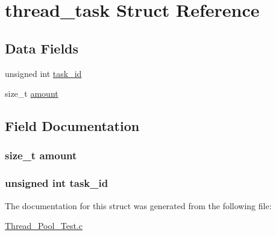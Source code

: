 \hypertarget{structthread__task}{}\section{thread\+\_\+task Struct Reference}
\label{structthread__task}
\subsection*{Data Fields}
\begin{DoxyCompactItemize}
\item 
unsigned int \hyperlink{structthread__task_a58c57e49f419d348fbd6a2fc249e008f}{task\+\_\+id}
\item 
size\+\_\+t \hyperlink{structthread__task_a09041dfaf996bee7cc220f076325f2ec}{amount}
\end{DoxyCompactItemize}


\subsection{Field Documentation}
\hypertarget{structthread__task_a09041dfaf996bee7cc220f076325f2ec}{}
\subsubsection[{amount}]{\setlength{\rightskip}{0pt plus 5cm}size\+\_\+t amount}\label{structthread__task_a09041dfaf996bee7cc220f076325f2ec}
\hypertarget{structthread__task_a58c57e49f419d348fbd6a2fc249e008f}{}
\subsubsection[{task\+\_\+id}]{\setlength{\rightskip}{0pt plus 5cm}unsigned int task\+\_\+id}\label{structthread__task_a58c57e49f419d348fbd6a2fc249e008f}


The documentation for this struct was generated from the following file\+:\begin{DoxyCompactItemize}
\item 
\hyperlink{_thread___pool___test_8c}{Thread\+\_\+\+Pool\+\_\+\+Test.\+c}\end{DoxyCompactItemize}
